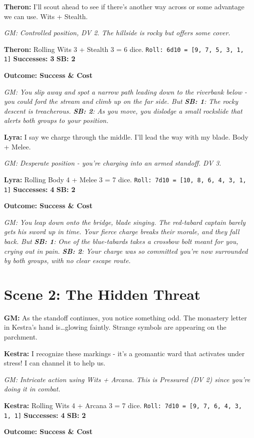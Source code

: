 \documentclass[11pt]{article}
\newcommand{\player}[1]{\textbf{#1:}}
\newcommand{\gm}[1]{\textit{GM: #1}}
\newcommand{\roll}[2]{\texttt{Roll: #1d10 = [#2]}}
\newcommand{\success}[1]{\textbf{Successes: #1}}
\newcommand{\cp}[1]{\textbf{SB: #1}}
\newcommand{\outcome}[1]{\textbf{Outcome: #1}}
\begin{document}
\player{Theron} I'll scout ahead to see if there's another way across or some advantage we can use. Wits + Stealth.

\gm{Controlled position, DV 2. The hillside is rocky but offers some cover.}

\player{Theron} Rolling Wits 3 + Stealth 3 = 6 dice. \roll{6}{9, 7, 5, 3, 1, 1} \success{3} \cp{2}

\outcome{Success \& Cost}

\gm{You slip away and spot a narrow path leading down to the riverbank below - you could ford the stream and climb up on the far side. But \cp{1}: The rocky descent is treacherous. \cp{2}: As you move, you dislodge a small rockslide that alerts both groups to your position.}

\player{Lyra} I say we charge through the middle. I'll lead the way with my blade. Body + Melee.

\gm{Desperate position - you're charging into an armed standoff. DV 3.}

\player{Lyra} Rolling Body 4 + Melee 3 = 7 dice. \roll{7}{10, 8, 6, 4, 3, 1, 1} \success{4} \cp{2}

\outcome{Success \& Cost}

\gm{You leap down onto the bridge, blade singing. The red-tabard captain barely gets his sword up in time. Your fierce charge breaks their morale, and they fall back. But \cp{1}: One of the blue-tabards takes a crossbow bolt meant for you, crying out in pain. \cp{2}: Your charge was so committed you're now surrounded by both groups, with no clear escape route.}

\section*{Scene 2: The Hidden Threat}

\player{GM} As the standoff continues, you notice something odd. The monastery letter in Kestra's hand is\dots glowing faintly. Strange symbols are appearing on the parchment.

\player{Kestra} I recognize these markings - it's a geomantic ward that activates under stress! I can channel it to help us.

\gm{Intricate action using Wits + Arcana. This is Pressured (DV 2) since you're doing it in combat.}

\player{Kestra} Rolling Wits 4 + Arcana 3 = 7 dice. \roll{7}{9, 7, 6, 4, 3, 1, 1} \success{4} \cp{2}

\outcome{Success \& Cost}
\end{document}
